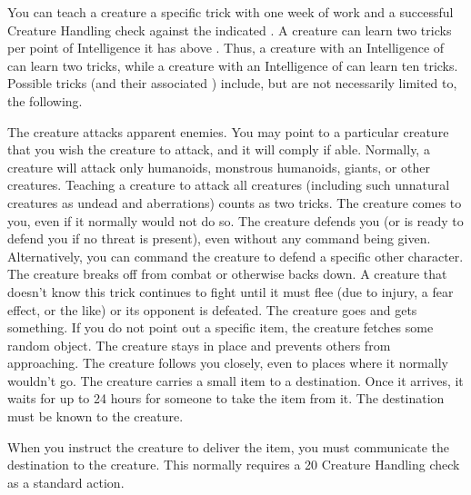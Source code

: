          You can teach a creature a specific trick with one week of work and a successful Creature Handling check against the indicated . A creature can learn two tricks per point of Intelligence it has above . Thus, a creature with an Intelligence of  can learn two tricks, while a creature with an Intelligence of  can learn ten tricks. Possible tricks (and their associated ) include, but are not necessarily limited to, the following.

         The creature attacks apparent enemies. You may point to a particular creature that you wish the creature to attack, and it will comply if able. Normally, a creature will attack only humanoids, monstrous humanoids, giants, or other creatures. Teaching a creature to attack all creatures (including such unnatural creatures as undead and aberrations) counts as two tricks.
         The creature comes to you, even if it normally would not do so.
         The creature defends you (or is ready to defend you if no threat is present), even without any command being given. Alternatively, you can command the creature to defend a specific other character.
         The creature breaks off from combat or otherwise backs down. A creature that doesn't know this trick continues to fight until it must flee (due to injury, a fear effect, or the like) or its opponent is defeated.
         The creature goes and gets something. If you do not point out a specific item, the creature fetches some random object.
         The creature stays in place and prevents others from approaching.
         The creature follows you closely, even to places where it normally wouldn't go.
         The creature carries a small item to a destination.
        Once it arrives, it waits for up to 24 hours for someone to take the item from it.
        The destination must be known to the creature.
        \par When you instruct the creature to deliver the item, you must communicate the destination to the creature.
        This normally requires a  20 Creature Handling check as a standard action.
